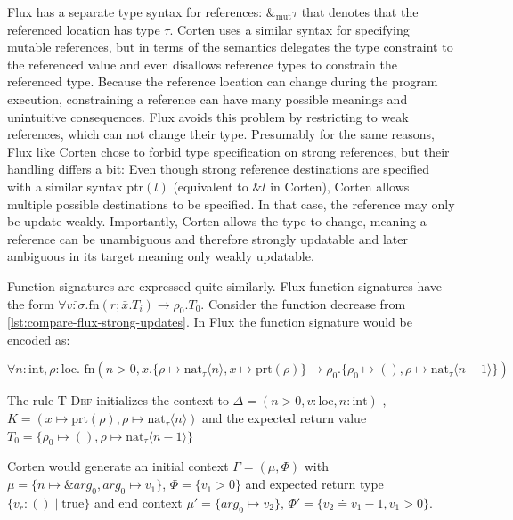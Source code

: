 Flux has a separate type syntax for references: $\&_{\text{mut}} \tau$ that denotes that the referenced location has type $\tau$. Corten uses a similar syntax for specifying mutable references, but in terms of the semantics delegates the type constraint to the referenced value and even disallows reference types to constrain the referenced type. Because the reference location can change during the program execution, constraining a reference can have many possible meanings and unintuitive consequences. Flux avoids this problem by restricting to weak references, which can not change their type.
Presumably for the same reasons, Flux \- like Corten \- chose to forbid type specification on strong references, but their handling differs a bit: Even though strong reference destinations are specified with a similar syntax $\text{ptr}\left(l\right)$ (equivalent to $\&l$ in Corten), Corten allows multiple possible destinations to be specified. In that case, the reference may only be update weakly. 
Importantly, Corten allows the type to change, meaning a reference can be unambiguous and therefore strongly updatable and later ambiguous in its target meaning only weakly updatable.

Function signatures are expressed quite similarly. 
Flux function signatures have the form $\forall \bar{v : \sigma}. \text{fn}\left(r ; \bar{x}. T_i\right) \to \rho_0.T_0$.
Consider the function decrease from \cref{lst:compare-flux-strong-updates}. In Flux the function signature would be encoded as:

\[\forall n : \text{int}, \rho : \text{loc}.
  \text{ fn}\left(n > 0, 
    x.\{ \rho \mapsto \text{nat}_{\tau}\langle n \rangle, x \mapsto \text{prt}(\rho)\}
    \rightarrow 
    \rho_0. \{\rho_0 \mapsto (), \rho \mapsto \text{nat}_{\tau}\langle n - 1 \rangle \}
    \right)
\]

The rule \textsc{T-Def} initializes the context to 
  $\Delta = (n > 0, v : \text{loc}, n : \text{int})$
  , $K = (x \mapsto \text{prt}(\rho), \rho \mapsto \text{nat}_{\tau}\langle n \rangle)$
  and the expected return value $T_0 = \{\rho_0 \mapsto (), \rho \mapsto \text{nat}_{\tau}\langle n - 1 \rangle \}$

Corten would generate an initial context $\Gamma = (\mu, \Phi)$ with $\mu = \{n \mapsto \&arg_0, arg_0 \mapsto v_1\}$, $\Phi = \{v_1 > 0\}$ and expected return type $\{ v_r : () \mid \text{true}\}$ and end context $\mu' = \{arg_0 \mapsto v_2\}$,
$\Phi' = \{v_2 \doteq v_1 - 1, v_1 > 0\}$.

